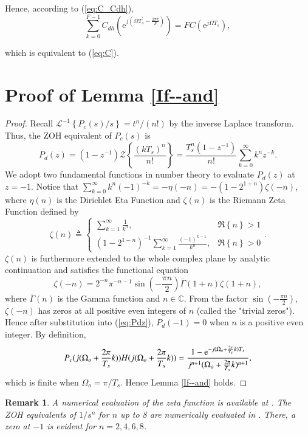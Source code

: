 \documentclass [11pt, proquest] {uwthesis}[2020/02/24]
\newtheorem{remark}{Remark}
\begin{document}
\noindent Hence, according to (\ref{eq:C_Cdh}),
\begin{equation}
\sum_{k=0}^{F-1}C_{dh}(\text{e}^{j(\Omega T_{s}^{'}-\frac{2\pi k}{F})})=FC(\text{e}^{j\Omega T_{s}}),\label{eq:Cdh-sum-C}
\end{equation}

\noindent which is equivalent to (\ref{eq:C}).

\section{Proof of Lemma \mbox{\ref{If--and}}} \label{chapA:Proof-of-Lemma-3}

\begin{proof}
Recall $\mathcal{L}^{-1}\left\{ P_{c}(s)/s\right\} =t^{n}/(n!)$ by
the inverse Laplace transform. Thus, the ZOH equivalent of $P_{c}(s)$
is
\begin{equation}
P_{d}(z)=(1-z^{-1})\mathcal{Z}\left\{ \frac{(kT_{s})^{n}}{n!}\right\} =\frac{T_{s}^{n}(1-z^{-1})}{n!}\sum_{k=0}^{\infty}k^{n}z^{-k}.\label{eq:Pdz}
\end{equation}
We adopt two fundamental functions in number theory to evaluate $P_{d}(z)$
at $z=-1$. Notice that $\sum_{k=0}^{\infty}k^{n}(-1)^{-k}=-\eta(-n)=-(1-2^{1+n})\zeta(-n)$,
where $\eta(n)$ is the Dirichlet Eta Function and $\zeta(n)$ is
the Riemann Zeta Function \cite{23} defined by
\[
\zeta(n)\triangleq\begin{cases}
\sum_{k=1}^{\infty}\frac{1}{k^{n}}, & \Re\left\{ n\right\} >1\\
(1-2^{1-n})^{-1}\sum_{k=1}^{\infty}\frac{(-1)^{k-1}}{k^{n}}, & \Re\left\{ n\right\} >0
\end{cases}.
\]
$\zeta(n)$ is furthermore extended to the whole complex plane by
analytic continuation and satisfies the functional equation \cite[Chapter 2]{titchmarsh1986theory,edwards1974riemanns}
\begin{equation}
\zeta(-n)=2^{-n}\pi^{-n-1}\sin\left(-\frac{\pi n}{2}\right)\overline{\Gamma}(1+n)\zeta(1+n),\label{eq:RFE-1}
\end{equation}
where $\overline{\Gamma}(n)$ is the Gamma function and $n\in\mathbb{C}$.
From the factor $\sin\left(-\frac{\pi n}{2}\right)$, $\zeta(-n)$
has zeros at all positive even integers of $n$ (called the "trivial
zeros"). Hence after substitution into (\ref{eq:Pdz}),
$P_{d}(-1)=0$ when $n$ is a positive even integer. By definition,
\[
P_{c}(j(\Omega_{o}+\frac{2\pi}{T_{s}}k))H(j(\Omega_{o}+\frac{2\pi}{T_{s}}k))=\frac{1-\mathrm{e}^{-j(\Omega_{o}+\frac{2\pi}{T_{s}}k)T_{s}}}{j^{n+1}(\Omega_{o}+\frac{2\pi}{T_{s}}k)^{n+1}},
\]
which is finite when $\Omega_{o}=\pi/T_{s}$. Hence Lemma \ref{If--and}
holds.
\end{proof}
\begin{remark}A numerical evaluation of the zeta function is available
at \cite{wolframZeta}. The ZOH equivalents of $1/s^{n}$ for $n$
up to 8 are numerically evaluated in \cite{Astrom1984_zerosOfSampledSys}.
There, a zero at $-1$ is evident for $n=2,4,6,8$. \end{remark}
\end{document}
